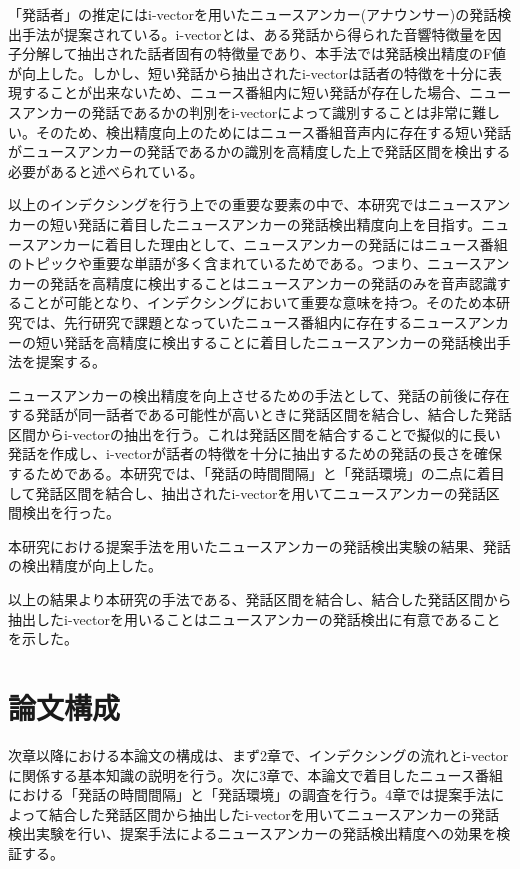 「発話者」の推定にはi-vector\cite{iv}を用いたニュースアンカー(アナウンサー)の発話検出手法\cite{nozaki_gakuseikai}が提案されている。i-vectorとは、ある発話から得られた音響特徴量を因子分解して抽出された話者固有の特徴量であり、本手法では発話検出精度のF値が向上した。しかし、短い発話から抽出されたi-vectorは話者の特徴を十分に表現することが出来ないため\cite{panaiv}、ニュース番組内に短い発話が存在した場合、ニュースアンカーの発話であるかの判別をi-vectorによって識別することは非常に難しい。そのため、検出精度向上のためにはニュース番組音声内に存在する短い発話がニュースアンカーの発話であるかの識別を高精度した上で発話区間を検出する必要があると述べられている。\par

以上のインデクシングを行う上での重要な要素の中で、本研究ではニュースアンカーの短い発話に着目したニュースアンカーの発話検出精度向上を目指す。ニュースアンカーに着目した理由として、ニュースアンカーの発話にはニュース番組のトピックや重要な単語が多く含まれているためである。つまり、ニュースアンカーの発話を高精度に検出することはニュースアンカーの発話のみを音声認識することが可能となり、インデクシングにおいて重要な意味を持つ。そのため本研究では、先行研究\cite{nozaki_gakuseikai}で課題となっていたニュース番組内に存在するニュースアンカーの短い発話を高精度に検出することに着目したニュースアンカーの発話検出手法を提案する。\par

ニュースアンカーの検出精度を向上させるための手法として、発話の前後に存在する発話が同一話者である可能性が高いときに発話区間を結合し、結合した発話区間からi-vectorの抽出を行う。これは発話区間を結合することで擬似的に長い発話を作成し、i-vectorが話者の特徴を十分に抽出するための発話の長さを確保するためである。本研究では、「発話の時間間隔」と「発話環境」の二点に着目して発話区間を結合し、抽出されたi-vectorを用いてニュースアンカーの発話区間検出を行った。\par

本研究における提案手法を用いたニュースアンカーの発話検出実験の結果、発話の検出精度が向上した。\par

以上の結果より本研究の手法である、発話区間を結合し、結合した発話区間から抽出したi-vectorを用いることはニュースアンカーの発話検出に有意であることを示した。

\section{論文構成}
次章以降における本論文の構成は、まず2章で、インデクシングの流れとi-vectorに関係する基本知識の説明を行う。次に3章で、本論文で着目したニュース番組における「発話の時間間隔」と「発話環境」の調査を行う。4章では提案手法によって結合した発話区間から抽出したi-vectorを用いてニュースアンカーの発話検出実験を行い、提案手法によるニュースアンカーの発話検出精度への効果を検証する。

